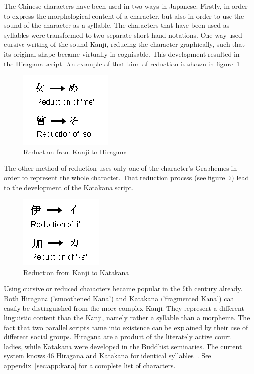 The Chinese characters have been used in two ways in Japanese. 
Firstly, in order to express the morphological content of a character,
but also in order to use the sound of the character as a syllable.
The characters that have been used as syllables were transformed to two 
separate short-hand notations. 
One way used cursive writing of the sound Kanji, reducing the character 
graphically, such that its original shape became virtually in-cognisable.
This development resulted in the Hiragana script. An example of that kind of 
reduction is shown in figure~\ref{fig:reductiontohiragana}.
\begin{figure}[htbp]
\begin{center}
\includegraphics[scale=0.7]{images/reductiontohiragana.png}
\caption{Reduction from Kanji to Hiragana}
\label{fig:reductiontohiragana}
\end{center}
\end{figure}
The other method of reduction uses only one of the character's Graphemes in
order to represent the whole character. That reduction process (see 
figure~\ref{fig:reductiontokatakana}) lead to the development of the
Katakana script.
\begin{figure}[htbp] 
\begin{center}
\includegraphics[scale=0.7]{images/reductiontokatakana.png}
\caption{Reduction from Kanji to Katakana}
\label{fig:reductiontokatakana}
\end{center}
\end{figure}

Using cursive or reduced characters became popular in the 9th century already.
Both Hiragana ('smoothened Kana') and Katakana ('fragmented Kana') can easily be 
distinguished from the more complex Kanji. They represent a different linguistic 
content than the Kanji, namely rather a syllable than a morpheme.
The fact that two parallel scripts came into existence can be explained by 
their use of different social groups. Hiragana are a product of the literately 
active court ladies, while Katakana were developed in the Buddhist seminaries.
The current system knows 46 Hiragana and Katakana for identical 
syllables~. See appendix~\ref{sec:app:kana} for a 
complete list of characters.

